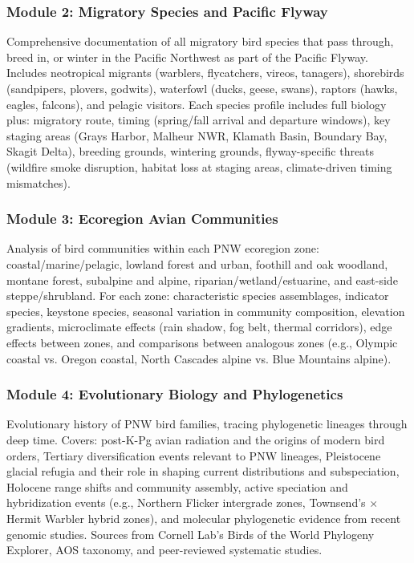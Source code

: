 \documentclass[11pt,letterpaper]{article}
\begin{document}
\subsubsection{Module 2: Migratory Species and Pacific Flyway}
Comprehensive documentation of all migratory bird species that pass through, breed in, or winter in the Pacific Northwest as part of the Pacific Flyway. Includes neotropical migrants (warblers, flycatchers, vireos, tanagers), shorebirds (sandpipers, plovers, godwits), waterfowl (ducks, geese, swans), raptors (hawks, eagles, falcons), and pelagic visitors. Each species profile includes full biology plus: migratory route, timing (spring/fall arrival and departure windows), key staging areas (Grays Harbor, Malheur NWR, Klamath Basin, Boundary Bay, Skagit Delta), breeding grounds, wintering grounds, flyway-specific threats (wildfire smoke disruption, habitat loss at staging areas, climate-driven timing mismatches).

\subsubsection{Module 3: Ecoregion Avian Communities}
Analysis of bird communities within each PNW ecoregion zone: coastal/marine/pelagic, lowland forest and urban, foothill and oak woodland, montane forest, subalpine and alpine, riparian/wetland/estuarine, and east-side steppe/shrubland. For each zone: characteristic species assemblages, indicator species, keystone species, seasonal variation in community composition, elevation gradients, microclimate effects (rain shadow, fog belt, thermal corridors), edge effects between zones, and comparisons between analogous zones (e.g., Olympic coastal vs. Oregon coastal, North Cascades alpine vs. Blue Mountains alpine).

\subsubsection{Module 4: Evolutionary Biology and Phylogenetics}
Evolutionary history of PNW bird families, tracing phylogenetic lineages through deep time. Covers: post-K-Pg avian radiation and the origins of modern bird orders, Tertiary diversification events relevant to PNW lineages, Pleistocene glacial refugia and their role in shaping current distributions and subspeciation, Holocene range shifts and community assembly, active speciation and hybridization events (e.g., Northern Flicker intergrade zones, Townsend's $\times$ Hermit Warbler hybrid zones), and molecular phylogenetic evidence from recent genomic studies. Sources from Cornell Lab's Birds of the World Phylogeny Explorer, AOS taxonomy, and peer-reviewed systematic studies.
\end{document}
